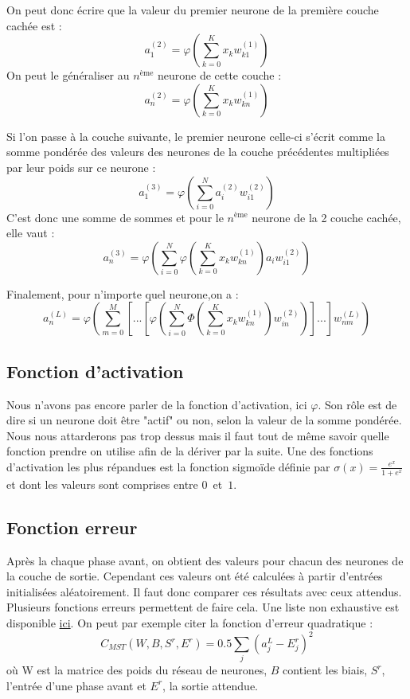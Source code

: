 	On peut donc écrire que la valeur du premier neurone de la première couche cachée est : 
	$$a_1^{(2)} = \varphi\left(\sum_{k=0}^{K}x_kw_{k1}^{(1)}\right)$$
	On peut le généraliser au $n^{\text{ème}}$ neurone de cette couche :
	$$a_n^{(2)} = \varphi\left(\sum_{k=0}^{K}x_kw_{kn}^{(1)}\right)$$
	
	\noindent Si l'on passe à la couche suivante, le premier neurone celle-ci s'écrit comme la somme pondérée des valeurs des neurones de la couche précédentes multipliées par leur poids sur ce neurone : 
	$$a_1^{(3)}  = \varphi\left(\sum_{i=0}^{N}a_i^{(2)}w_{i1}^{(2)}\right)$$
	C'est donc une somme de sommes et pour le $n^{\text{ème}}$ neurone de la 2\ieme{} couche cachée, elle vaut :
	$$a_n^{(3)} = \varphi\left(\sum_{i=0}^{N}\varphi\left(\sum_{k=0}^{K}x_kw_{kn}^{(1)}\right)a_i w_{i1}^{(2)}\right)$$
	
	\noindent Finalement, pour n'importe quel neurone,on a :
	$$ a_n^{(L)} = \varphi\left(\sum_{m=0}^{M}\left[...\left[\varphi\left(\sum_{i=0}^{N}\varPhi\left(\sum_{k=0}^{K}x_kw_{kn}^{(1)}\right)w_{in}^{(2)}\right)\right]...\right]w_{nm}^{(L)}\right) $$
	
	
\subsection{Fonction d'activation}
	Nous n'avons pas encore parler de la fonction d'activation, ici $\varphi$. Son rôle est de dire si un neurone doit être "actif" ou non, selon la valeur de la somme pondérée. Nous nous attarderons pas trop dessus mais il faut tout de même savoir quelle fonction prendre on utilise afin de la dériver par la suite. Une des fonctions d'activation les plus répandues est la fonction sigmoïde définie par $\sigma(x) = \frac{e^x}{1+e^x}$ et dont les valeurs sont comprises entre \mbox{$0$ et $1$.}
		
\subsection{Fonction erreur}
	Après la chaque phase avant, on obtient des valeurs pour chacun des neurones de la couche de sortie. Cependant ces valeurs ont été calculées à partir d'entrées initialisées aléatoirement. Il faut donc comparer ces résultats avec ceux attendus. Plusieurs fonctions erreurs permettent de faire cela. Une liste non exhaustive est disponible \href{https://stats.stackexchange.com/questions/154879/a-list-of-cost-functions-used-in-neural-networks-alongside-applications}{ici}. On peut par exemple citer la fonction d'erreur quadratique : 
	$$C_{MST}(W, B, S^r, E^r) = 0.5\sum\limits_j (a^L_j - E^r_j)^2$$
	où W est la matrice des poids du réseau de neurones, $B$ contient les biais, $S^r$, l'entrée d'une phase avant et $E^r$, la sortie attendue.\\
	
